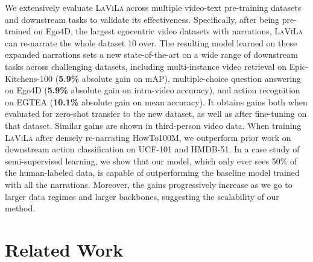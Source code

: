\documentclass[10pt,twocolumn,letterpaper]{article}
\newcommand{\ours}{\textsc{LaViLa}\xspace}
\begin{document}
We extensively evaluate \ours across multiple video-text pre-training datasets and downstream tasks to validate its effectiveness.
Specifically, after being pre-trained on Ego4D, the largest egocentric video datasets with narrations, \ours can re-narrate the whole dataset 10 over. The resulting model learned on these expanded narrations sets a new state-of-the-art on
a wide range of downstream tasks across challenging datasets, including multi-instance video retrieval on Epic-Kitchens-100 ({\bf 5.9\%} absolute gain on mAP), multiple-choice question answering on Ego4D ({\bf 5.9\%} absolute gain on intra-video accuracy), and action recognition on EGTEA ({\bf 10.1\%} absolute gain on mean accuracy). It obtains gains both when evaluated for zero-shot transfer to the new dataset, as well as after fine-tuning on that dataset.
Similar gains are shown in third-person video data. When training \ours after densely re-narrating HowTo100M, we outperform prior work on downstream action classification on UCF-101 and HMDB-51.
In a case study of semi-supervised learning, we show that our model, which only ever sees 50\% of the human-labeled data, is capable of outperforming the baseline model trained with all the narrations.
Moreover, the gains progressively increase as we go to larger data regimes and larger backbones, suggesting the scalability of our method.

















 \section{Related Work}
\end{document}

